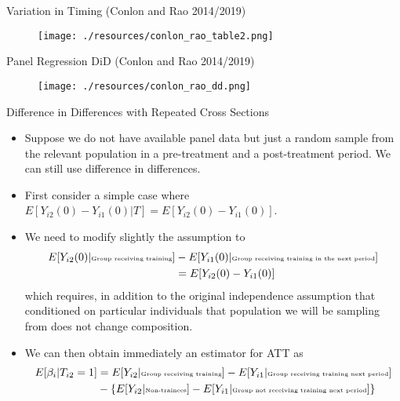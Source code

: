 \documentclass[xcolor=pdftex,dvipsnames,table,mathserif,aspectratio=169]{beamer}
\begin{document}
\begin{frame}{Variation in Timing (Conlon and Rao 2014/2019)}
\begin{figure}
\centering
\texttt{[image: ./resources/conlon\_rao\_table2.png]}
\end{figure}
\end{frame}



\begin{frame}{Panel Regression DiD (Conlon and Rao 2014/2019)}
\begin{figure}
\centering
\texttt{[image: ./resources/conlon\_rao\_dd.png]}
\end{figure}
\end{frame}




\begin{frame}{Difference in Differences with Repeated Cross Sections}
\small
\begin{itemize}
\item Suppose we do not have available panel data but just a random sample from the relevant population in a pre-treatment and a post-treatment period. We can still use difference in differences.
\item First consider a simple case where {\small $E[Y_{i2}(0)- Y_{i1}(0) | T] = E[Y_{i2}(0)- Y_{i1}(0)]$}.
\item We need to modify slightly the assumption to
\vspace{-.5pc}
\begin{align*}
E[Y_{i2}(0) | \text{\tiny Group receiving training}]&-E[Y_{i1}(0) | \text{\tiny Group receiving training in the next period}] \\
&= E[Y_{i2}(0)-Y_{i1}(0)]  
\end{align*}
which requires, in addition to the original independence
assumption that conditioned on particular individuals that population we will be sampling from does not change composition.
\item We can then obtain immediately an estimator for ATT as
\begin{align*}
E[\beta_i |T_{i2}=1] 
&= E[Y_{i2}| \text{\tiny Group receiving training}]-E[Y_{i1}| \text{\tiny Group receiving training next period}] \\
&- \{E[Y_{i2} | \text{\tiny Non-trainees}] - E[Y_{i1} | \text{\tiny Group not receiving training next period}]\}
\end{align*}
\end{itemize}
\end{frame}
\end{document}
